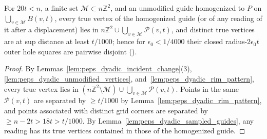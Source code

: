 \begin{lemma}
    \label{thm:peps_dyadic_temporary_holes}
    \leanok
    For $20t<n$, a finite set $\mathcal M\subset n\mathbb Z^2$, and an unmodified
    guide homogenized to $P$ on $\bigcup_{v\in\mathcal M}B(v,t)$, every true
    vertex of the homogenized guide (or of any reading of it after a displacement)
    lies in $n\mathbb Z^2\cup\bigcup_{v\in\mathcal M}\mathcal P(v,t)$, and
    distinct true vertices are at sup distance at least $t/1000$; hence for
    $\epsilon_0<1/4000$ their closed radius-$2\epsilon_0t$ outer hole squares are
    pairwise disjoint (\cite[Section~7, lines 347--351]{OpenAI2026PolynomialPEPS}).
\end{lemma}

\begin{proof}\leanok
    By Lemmas~\ref{lem:peps_dyadic_incident_change}(3),
    \ref{lem:peps_dyadic_unmodified_vertices}, and~\ref{lem:peps_dyadic_rim_pattern},
    every true vertex lies in $(n\mathbb Z^2\setminus\mathcal M)\cup\bigcup_{v\in\mathcal M}\mathcal P(v,t)$.
    Points in the same $\mathcal P(v,t)$ are separated by $\ge t/1000$ by
    Lemma~\ref{lem:peps_dyadic_rim_pattern}, and points associated with distinct
    grid corners are separated by $\ge n-2t>18t>t/1000$. By
    Lemma~\ref{lem:peps_dyadic_sampled_guides}, any reading has its true vertices
    contained in those of the homogenized guide.
\end{proof}

